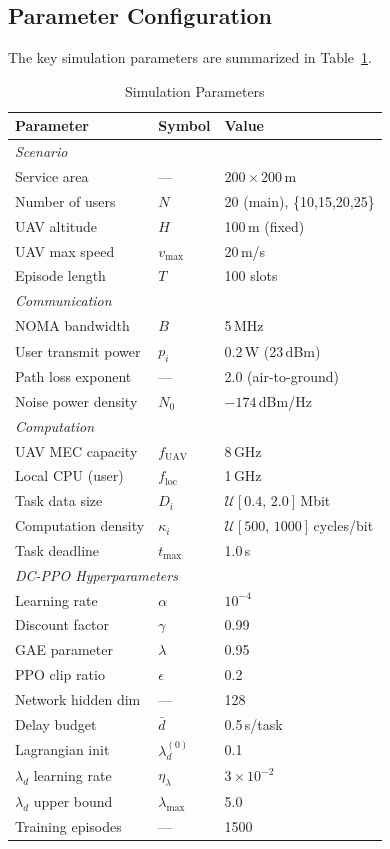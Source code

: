 \documentclass[journal]{IEEEtran}
\newcommand{\uav}{\text{UAV}}
\newcommand{\ld}{\lambda_d}
\begin{document}
\subsection{Parameter Configuration}

The key simulation parameters are summarized in Table~\ref{tab:params}.

\begin{table}[!t]
\centering
\caption{Simulation Parameters}
\label{tab:params}
\renewcommand{\arraystretch}{1.15}
\begin{tabular}{lll}
\toprule
\textbf{Parameter} & \textbf{Symbol} & \textbf{Value} \\
\midrule
\multicolumn{3}{l}{\textit{Scenario}} \\
Service area        & ---     & $200\times200$\,m \\
Number of users     & $N$     & 20 (main), \{10,15,20,25\} \\
UAV altitude        & $H$     & 100\,m (fixed) \\
UAV max speed       & $v_{\max}$ & 20\,m/s \\
Episode length      & $T$     & 100 slots \\
\midrule
\multicolumn{3}{l}{\textit{Communication}} \\
NOMA bandwidth      & $B$     & 5\,MHz \\
User transmit power & $p_i$   & 0.2\,W (23\,dBm) \\
Path loss exponent  & ---     & 2.0 (air-to-ground) \\
Noise power density & $N_0$   & $-174$\,dBm/Hz \\
\midrule
\multicolumn{3}{l}{\textit{Computation}} \\
UAV MEC capacity    & $f_{\uav}$ & 8\,GHz \\
Local CPU (user)    & $f_{\text{loc}}$ & 1\,GHz \\
Task data size      & $D_i$   & $\mathcal{U}[0.4,\, 2.0]$\,Mbit \\
Computation density & $\kappa_i$ & $\mathcal{U}[500,\, 1000]$\,cycles/bit \\
Task deadline       & $t_{\max}$ & 1.0\,s \\
\midrule
\multicolumn{3}{l}{\textit{DC-PPO Hyperparameters}} \\
Learning rate       & $\alpha$ & $10^{-4}$ \\
Discount factor     & $\gamma$ & 0.99 \\
GAE parameter       & $\lambda$ & 0.95 \\
PPO clip ratio      & $\epsilon$ & 0.2 \\
Network hidden dim  & ---     & 128 \\
Delay budget        & $\bar{d}$ & 0.5\,s/task \\
Lagrangian init     & $\ld^{(0)}$ & 0.1 \\
$\ld$ learning rate & $\eta_\lambda$ & $3\times10^{-2}$ \\
$\ld$ upper bound   & $\lambda_{\max}$ & 5.0 \\
Training episodes   & ---     & 1500 \\
\bottomrule
\end{tabular}
\end{table}
\end{document}
